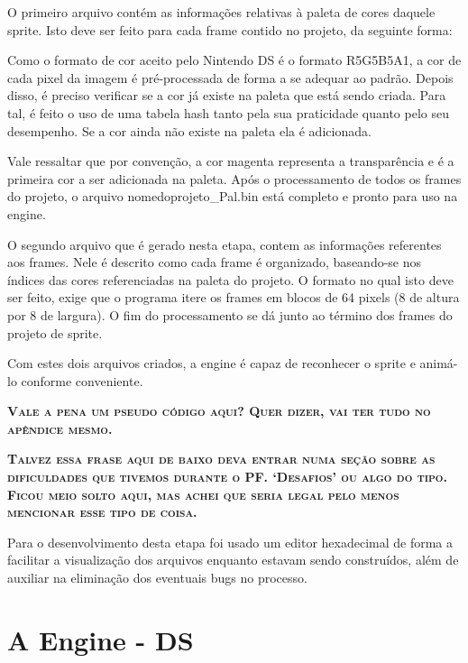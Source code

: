 \documentclass[brazil]{abnt}
\begin{document}
O primeiro arquivo contém as informações relativas à paleta de cores daquele sprite. Isto deve ser feito para cada frame contido no projeto, da seguinte forma:

Como o formato de cor aceito pelo Nintendo DS é o formato R5G5B5A1\footnotemark, a cor de cada pixel da imagem é pré-processada de forma a se adequar ao padrão. Depois disso, é preciso verificar se a cor já existe na paleta que está sendo criada. Para tal, é feito o uso de uma tabela hash tanto pela sua praticidade quanto pelo seu desempenho. Se a cor ainda não existe na paleta ela é adicionada. 

Vale ressaltar que por convenção, a cor magenta representa a transparência e é a primeira cor a ser adicionada na paleta. Após o processamento de todos os frames do projeto, o arquivo nomedoprojeto\_Pal.bin está completo e pronto para uso na engine.

O segundo arquivo que é gerado nesta etapa, contem as informações referentes aos frames. Nele é descrito como cada frame é organizado, baseando-se nos índices das cores referenciadas na paleta do projeto. O formato no qual isto deve ser feito, exige que o programa itere os frames em blocos de 64 pixels (8 de altura por 8 de largura). O fim do processamento se dá junto ao término dos frames do projeto de sprite. 

Com estes dois arquivos criados, a engine é capaz de reconhecer o sprite e animá-lo conforme conveniente. 

\textsc{\textbf{Vale a pena um pseudo código aqui? Quer dizer, vai ter tudo no apêndice mesmo.}}

\textsc{\textbf{Talvez essa frase aqui de baixo deva entrar numa seção sobre as dificuldades que tivemos durante o PF. ‘Desafios’ ou algo do tipo. Ficou meio solto aqui, mas achei que seria legal pelo menos mencionar esse tipo de coisa.}}

Para o desenvolvimento desta etapa foi usado um editor hexadecimal de forma a facilitar a visualização dos arquivos enquanto estavam sendo construídos, além de auxiliar na eliminação dos eventuais bugs no processo. 

\chapter{A Engine - DS}
\end{document}
